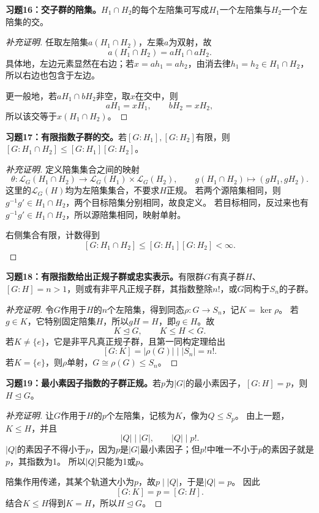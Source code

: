 \begin{problem}
\textbf{习题16：交子群的陪集。}$H_1\cap H_2$的每个左陪集可写成$H_1$一个左陪集与$H_2$一个左陪集的交。
\end{problem}
\begin{proof}[补充证明]
任取左陪集$a(H_1\cap H_2)$，左乘$a$为双射，故
\[
a(H_1\cap H_2)=aH_1\cap aH_2.
\]
具体地，左边元素显然在右边；若$x=ah_1=ah_2$，由消去律$h_1=h_2\in H_1\cap H_2$，所以右边也包含于左边。

更一般地，若$aH_1\cap bH_2$非空，取$x$在交中，则
\[
aH_1=xH_1,\qquad bH_2=xH_2,
\]
所以该交等于$x(H_1\cap H_2)$。
\end{proof}

\begin{problem}
\textbf{习题17：有限指数子群的交。}若$[G:H_1],[G:H_2]$有限，则
$[G:H_1\cap H_2]\leq[G:H_1][G:H_2]$。
\end{problem}
\begin{proof}[补充证明]
定义陪集集合之间的映射
\[
\theta:\mathcal L_G(H_1\cap H_2)\to\mathcal L_G(H_1)\times\mathcal L_G(H_2),
\qquad g(H_1\cap H_2)\longmapsto(gH_1,gH_2).
\]
这里的$\mathcal L_G(H)$均为左陪集集合，不要求$H$正规。
若两个源陪集相同，则$g^{-1}g'\in H_1\cap H_2$，两个目标陪集分别相同，故良定义。
若目标相同，反过来也有$g^{-1}g'\in H_1\cap H_2$，所以源陪集相同，映射单射。

右侧集合有限，计数得到
\[
[G:H_1\cap H_2]\leq[G:H_1][G:H_2]<\infty.
\]
\end{proof}

\begin{problem}
\textbf{习题18：有限指数给出正规子群或忠实表示。}有限群$G$有真子群$H$、$[G:H]=n>1$，则或有非平凡正规子群，其指数整除$n!$，或$G$同构于$S_n$的子群。
\end{problem}
\begin{proof}[补充证明]
令$G$作用于$H$的$n$个左陪集，得到同态$\rho:G\to S_n$，记$K=\ker\rho$。
若$g\in K$，它特别固定陪集$H$，所以$gH=H$，即$g\in H$。故
\[
K\trianglelefteq G,\qquad K\leq H<G.
\]
若$K\neq\{e\}$，它是非平凡真正规子群，且第一同构定理给出
\[
[G:K]=|\rho(G)|\mid|S_n|=n!.
\]
若$K=\{e\}$，则$\rho$单射，$G\cong\rho(G)\leq S_n$。
\end{proof}

\begin{problem}
\textbf{习题19：最小素因子指数的子群正规。}若$p$为$|G|$的最小素因子，$[G:H]=p$，则$H\trianglelefteq G$。
\end{problem}
\begin{proof}[补充证明]
让$G$作用于$H$的$p$个左陪集，记核为$K$，像为$Q\leq S_p$。
由上一题，$K\leq H$，并且
\[
|Q|\mid|G|,\qquad |Q|\mid p!.
\]
$|Q|$的素因子不得小于$p$，因为$p$是$|G|$最小素因子；但$p!$中唯一不小于$p$的素因子就是$p$，其指数为1。
所以$|Q|$只能为1或$p$。

陪集作用传递，其某个轨道大小为$p$，故$p\mid|Q|$，于是$|Q|=p$。
因此
\[
[G:K]=p=[G:H].
\]
结合$K\leq H$得到$K=H$，所以$H\trianglelefteq G$。
\end{proof}


